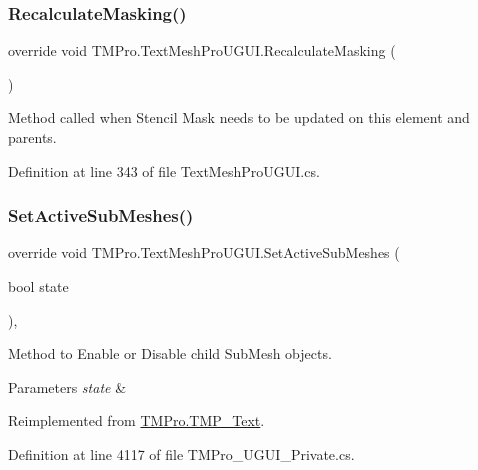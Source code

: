 \subsubsection{\texorpdfstring{RecalculateMasking()}{RecalculateMasking()}}
{\footnotesize\ttfamily override void T\+M\+Pro.\+Text\+Mesh\+Pro\+U\+G\+U\+I.\+Recalculate\+Masking (\begin{DoxyParamCaption}{ }\end{DoxyParamCaption})}



Method called when Stencil Mask needs to be updated on this element and parents. 



Definition at line 343 of file Text\+Mesh\+Pro\+U\+G\+U\+I.\+cs.

\mbox{\label{class_t_m_pro_1_1_text_mesh_pro_u_g_u_i_a955de616cf76ff0886112394b6289d85}} 
\subsubsection{\texorpdfstring{SetActiveSubMeshes()}{SetActiveSubMeshes()}}
{\footnotesize\ttfamily override void T\+M\+Pro.\+Text\+Mesh\+Pro\+U\+G\+U\+I.\+Set\+Active\+Sub\+Meshes (\begin{DoxyParamCaption}\item[{bool}]{state }\end{DoxyParamCaption})\hspace{0.3cm}{\ttfamily [protected]}, {\ttfamily [virtual]}}



Method to Enable or Disable child Sub\+Mesh objects. 


\begin{DoxyParams}{Parameters}
{\em state} & \\
\hline
\end{DoxyParams}


Reimplemented from \mbox{\hyperlink{class_t_m_pro_1_1_t_m_p___text_a83493a2f045f78defb9e86c92d1b3792}{T\+M\+Pro.\+T\+M\+P\+\_\+\+Text}}.



Definition at line 4117 of file T\+M\+Pro\+\_\+\+U\+G\+U\+I\+\_\+\+Private.\+cs.

\mbox{\label{class_t_m_pro_1_1_text_mesh_pro_u_g_u_i_a749eb1a6e9aa2f277b07a01f14483cc3}} 

